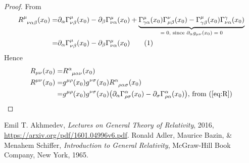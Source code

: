 \documentclass[]{article}
\newcommand\numberthis{\addtocounter{equation}{1}\tag{\theequation}}
\begin{document}
\begin{proof}
	From \cite[(53)]{akhmedev2016}
	\begin{align*}
	R\indices{^{\mu}_{\nu\alpha\beta}}(x_0) =& \partial_{\alpha}\Gamma^{\mu}_{\nu\beta}(x_0) - \partial_{\beta}\Gamma^{\mu}_{\nu\alpha}(x_0) + \underbrace{\Gamma^{\mu}_{\gamma\alpha}(x_0)\Gamma^{\nu}_{\mu\beta}(x_0)-\Gamma^{\mu}_{\gamma\beta}(x_0) \Gamma^{\gamma}_{\nu\alpha}(x_0)}_\text{$=0$, since $\partial_{\alpha}g_{\mu\nu}(x_0)=0$}\\
	=& \partial_{\alpha}\Gamma^{\mu}_{\nu\beta}(x_0) - \partial_{\beta}\Gamma^{\mu}_{\nu\alpha}(x_0) \numberthis\label{eq_rdef}
	\end{align*}
	Hence
	\begin{align*}
	R_{\mu\nu}(x_0) =&R\indices{^{\alpha}_{\mu\alpha\nu}}(x_0)\\
	R^{\mu\nu}(x_0)=& g^{\mu\rho}(x_0)g^{\nu\sigma}(x_0) R\indices{^{\alpha}_{\rho\alpha\sigma}}(x_0)\\
	=&g^{\mu\rho}(x_0)g^{\nu\sigma}(x_0)\big(\partial_{\alpha}\Gamma^{\alpha}_{\rho\sigma}(x_0) - \partial_{\sigma}\Gamma^{\alpha}_{\rho\alpha}(x_0) \big) \text{, from (\ref{eq:R})}
	\end{align*}
\end{proof}

\begin{thebibliography}{9}
	
	Emil T. Akhmedev,
	\emph{Lectures on General Theory of Relativity},
	2016,
	\url{https://arxiv.org/pdf/1601.04996v6.pdf}.
	Ronald Adler, Maurice Bazin, \& Menahem Schiffer,
	\emph{Introduction to General Relativity},
	McGraw-Hill Book Company, New York,
	1965.
	
	
\end{thebibliography}
\end{document}
